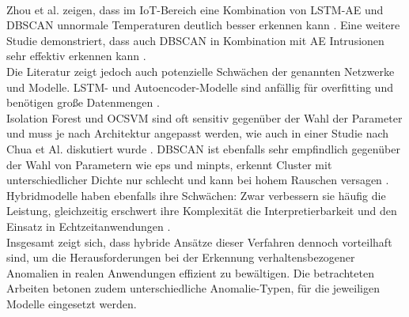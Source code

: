 \documentclass[a4paper,12pt]{article}
\begin{document}
	\\[0.5em]
	Zhou et al. zeigen, dass im IoT-Bereich eine Kombination von LSTM-AE und DBSCAN unnormale Temperaturen deutlich besser erkennen kann \cite{zhou2024improved}. Eine weitere Studie demonstriert, dass auch DBSCAN in Kombination mit AE Intrusionen sehr effektiv erkennen kann \cite{prabu2024dbscan}.
	\\[0.5em]
	Die Literatur zeigt jedoch auch potenzielle Schwächen der genannten Netzwerke und Modelle. LSTM- und Autoencoder-Modelle sind anfällig für \gls{overfitting} und benötigen große Datenmengen \cite{liu2019ensemble}.
	\\[0.5em]
	Isolation Forest und OCSVM sind oft sensitiv gegenüber der Wahl der Parameter und muss je nach Architektur angepasst werden, wie auch in einer Studie nach Chua et Al. diskutiert wurde \cite{chua2024web}. DBSCAN ist ebenfalls sehr empfindlich gegenüber der Wahl von Parametern wie \gls{eps} und \gls{minpts}, erkennt Cluster mit unterschiedlicher Dichte nur schlecht und kann bei hohem Rauschen versagen \cite{ahmadzadeh2025graphdbscan}.
	\\[0.5em]
	Hybridmodelle haben ebenfalls ihre Schwächen: Zwar verbessern sie häufig die Leistung, gleichzeitig erschwert ihre Komplexität die Interpretierbarkeit und den Einsatz in Echtzeitanwendungen \cite{Moussaoui2025}.
	\\[0.5em]
	Insgesamt zeigt sich, dass hybride Ansätze dieser Verfahren dennoch vorteilhaft sind, um die Herausforderungen bei der Erkennung verhaltensbezogener Anomalien in realen Anwendungen effizient zu bewältigen. Die betrachteten Arbeiten betonen zudem unterschiedliche Anomalie-Typen, für die jeweiligen Modelle eingesetzt werden. 
	
\end{document}
